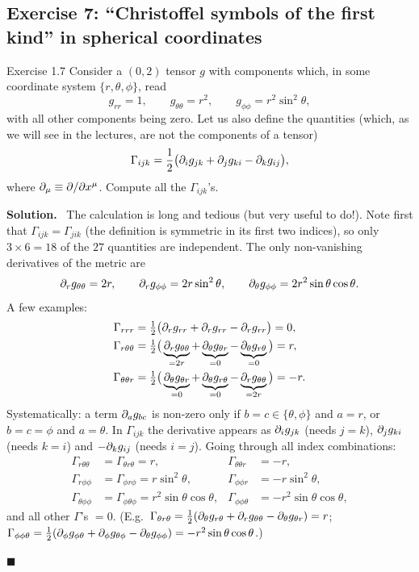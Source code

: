 \documentclass[11pt,a4paper]{article}
\numberwithin{equation}{subsection}
\newenvironment{solution}{\par\noindent\textbf{\textcolor{excol!70!black}{Solution.}}\ }{\hfill$\blacksquare$\par\medskip}
\newcommand{\added}[1]{{\color{teal!60!black}#1}}
\begin{document}
\subsection{Exercise 7: ``Christoffel symbols of the first kind'' in spherical coordinates}
\begin{problem}{Exercise 1.7}
Consider a $(0,2)$ tensor $g$ with components which, in some coordinate system $\{r,\theta,\phi\}$, read
\[
  g_{rr}=1,\qquad g_{\theta\theta}=r^2,\qquad g_{\phi\phi}=r^2\sin^2\theta ,
\]
with all other components being zero. Let us also define the quantities (which, as we will see in the lectures, are not the components of a tensor)
\[
  \Gamma_{ijk}=\frac12\big(\partial_ig_{jk}+\partial_jg_{ki}-\partial_kg_{ij}\big),
\]
where $\partial_\mu\equiv\partial/\partial x^\mu$. Compute all the $\Gamma_{ijk}$'s.
\end{problem}
\begin{solution}
The calculation is long and tedious (but very useful to do!). Note first that $\Gamma_{ijk}=\Gamma_{jik}$ (the definition is symmetric in its first two indices), so only $3\times6=18$ of the $27$ quantities are independent. The only non-vanishing derivatives of the metric are
\[
  \partial_rg_{\theta\theta}=2r,\qquad\partial_rg_{\phi\phi}=2r\sin^2\theta,\qquad\partial_\theta g_{\phi\phi}=2r^2\sin\theta\cos\theta .
\]
A few examples:
\begin{align*}
  \Gamma_{rrr}&=\tfrac12\big(\partial_rg_{rr}+\partial_rg_{rr}-\partial_rg_{rr}\big)=0,\\
  \Gamma_{r\theta\theta}&=\tfrac12\big(\underbrace{\partial_rg_{\theta\theta}}_{=2r}+\underbrace{\partial_\theta g_{\theta r}}_{=0}-\underbrace{\partial_\theta g_{r\theta}}_{=0}\big)=r,\\
  \Gamma_{\theta\theta r}&=\tfrac12\big(\underbrace{\partial_\theta g_{\theta r}}_{=0}+\underbrace{\partial_\theta g_{r\theta}}_{=0}-\underbrace{\partial_rg_{\theta\theta}}_{=2r}\big)=-r .
\end{align*}
\added{Systematically: a term $\partial_ag_{bc}$ is non-zero only if $b=c\in\{\theta,\phi\}$ and $a=r$, or $b=c=\phi$ and $a=\theta$. In $\Gamma_{ijk}$ the derivative appears as $\partial_ig_{jk}$ (needs $j=k$), $\partial_jg_{ki}$ (needs $k=i$) and $-\partial_kg_{ij}$ (needs $i=j$). Going through all index combinations:}
\begin{align*}
  \Gamma_{r\theta\theta}&=\Gamma_{\theta r\theta}=r, & \Gamma_{\theta\theta r}&=-r,\\
  \Gamma_{r\phi\phi}&=\Gamma_{\phi r\phi}=r\sin^2\theta, & \Gamma_{\phi\phi r}&=-r\sin^2\theta,\\
  \Gamma_{\theta\phi\phi}&=\Gamma_{\phi\theta\phi}=r^2\sin\theta\cos\theta, & \Gamma_{\phi\phi\theta}&=-r^2\sin\theta\cos\theta,
\end{align*}
and all other $\Gamma$'s $=0$. (E.g.\ $\Gamma_{\theta r\theta}=\frac12(\partial_\theta g_{r\theta}+\partial_rg_{\theta\theta}-\partial_\theta g_{\theta r})=r$; $\Gamma_{\phi\phi\theta}=\frac12(\partial_\phi g_{\phi\theta}+\partial_\phi g_{\theta\phi}-\partial_\theta g_{\phi\phi})=-r^2\sin\theta\cos\theta$.)


\end{solution}
\end{document}
